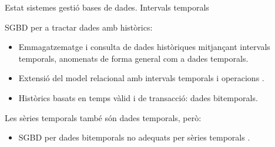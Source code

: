 \begin{frame}{Estat sistemes gestió bases de dades. Intervals temporals}

  SGBD per a tractar dades amb històrics:

  \begin{itemize}  

  \item Emmagatzematge i consulta de dades històriques mitjançant
    intervals temporals, anomenats de forma general com a dades
    temporals.

  \item Extensió del model relacional amb intervals temporals i
    operacions \parencite{date02:_tempor_data_relat_model}.

  \item Històrics basats en temps vàlid i de transacció: dades
    bitemporals.

  \end{itemize}
  
  Les sèries temporals també són dades temporals, però:

  \begin{itemize}  

  \item SGBD per dades bitemporals no adequats per sèries
    temporals \parencite{schmidt95}.

  \end{itemize}
    


\end{frame}



